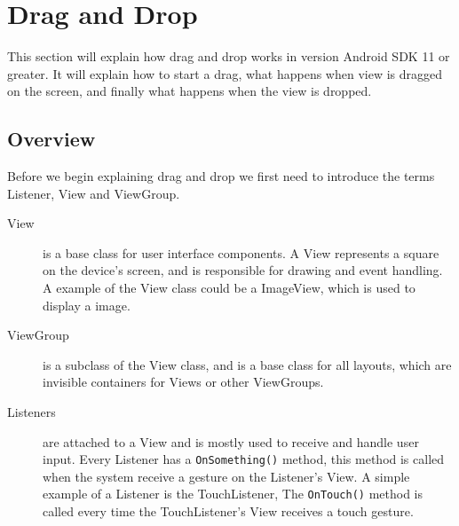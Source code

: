 \section{Drag and Drop}
\label{sec:androiddraganddrop}
This section will explain how drag and drop works in version Android SDK 11 or greater. It will explain how to start a drag, what happens when view is dragged on the screen, and finally what happens when the view is dropped.
\subsection*{Overview}
Before we begin explaining drag and drop we first need to introduce the terms Listener, View and ViewGroup.
\begin{description}
\item[View] is a base class for user interface components. A View represents a square on the device's screen, and is responsible for drawing and event handling. A example of the View class could be a ImageView, which is used to display a image.
\item[ViewGroup] is a subclass of the View class, and is a base class for all layouts, which are invisible containers for Views or other ViewGroups.
\item[Listeners] are attached to a View and is mostly used to receive and handle user input. Every Listener has a \lstinline|OnSomething()| method, this method is called when the system receive a gesture on the Listener's View. A simple example of a Listener is the TouchListener, The \lstinline|OnTouch()| method is called every time the TouchListener's View receives a touch gesture.
\end{description}

